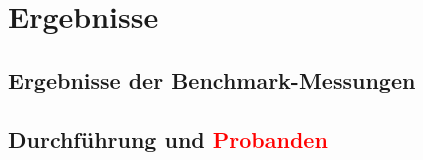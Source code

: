 
\chapter{Ergebnisse}
\label{chap:ergebnisse}

\section{Ergebnisse der Benchmark-Messungen}%
\label{sec:erg-benchmark}

\section[Durchführung und Probanden]{Durchführung und \textcolor{red}{Probanden}}%
\label{sec:durchfuehrung}

